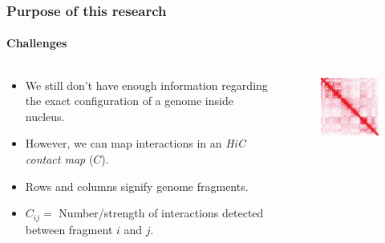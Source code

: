 \documentclass{beamer}
\begin{document}
\begin{frame}
    \frametitle{Purpose of this research}
    \framesubtitle{Challenges}
        \begin{columns}
            \begin{column}[c]{.6\textwidth}
                \begin{itemize}
                        \item We still don't have enough information  
                            regarding the exact configuration
                        of a genome inside nucleus.
                        \item However, we can map interactions  in an
                        \textit{HiC contact map} ($C$).
                    \item Rows and columns signify genome fragments.
                    \item $C_{ij} = $ Number/strength of interactions detected between
                        fragment $i$ and $j$.
                \end{itemize}                                                                                 
            \end{column}
            \begin{column}{.4\textwidth}
                \begin{figure}
                    \centering
                    \includegraphics[width=\textwidth]{figures/original_contact_map_chr14.png}
                    \caption*{ \cite{lieberman2009comprehensive}}
                \end{figure}
            \end{column}
        \end{columns}
\end{frame}  
\end{document}
